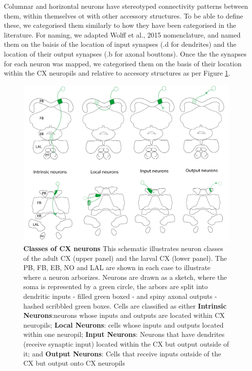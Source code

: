 Columnar and horizontal neurons have stereotyped connectivity patterns between them, within themselves ot with other accessory structures. To be able to define these, we categorised them similarly to how they have been categorised in the literature. For naming, we adapted Wolff et al., 2015 nomenclature, and named them on the baisis of the location of input synapses (.d for dendrites) and the location of their output synapses (.b for axonal bouttons). Once the the synapses for each neuron was mapped, we categorised them on the basis of their location within the CX neuropils and relative to accesory structures as per Figure \ref{CXclasses}. 


    \begin{figure}
        \centering
        \includegraphics[width=12cm]{Figs/CX/CX_Nomenclature_Neurons.pdf}
        \caption[Central Complex Neuron Classes]{\textbf{Classes of CX neurons} This schematic illustrates neuron classes of the adult CX (upper panel) and the larval CX (lower panel). The PB, FB, EB, NO and LAL are shown in each case to illustrate where a neuron arborizes. Neurons are drawn as a sketch, where the soma is represented by a green circle, the arbors are split into dendritic inputs - filled green boxed - and spiny axonal outputs - hashed scribbled green boxes. Cells are classified as either \textbf{Intrinsic Neurons}:neurons whose inputs and outputs are located within CX neuropils; \textbf{Local Neurons}: cells whose inputs and outputs located within one neuropil; \textbf{Input Neurons}: Neurons that have  dendrites (receive synaptic input) located within the CX but output outside of it; and \textbf{Output Neurons}: Cells that receive inputs outside of the CX but output onto CX neuropils}
        \label{CXclasses}
    \end{figure}



